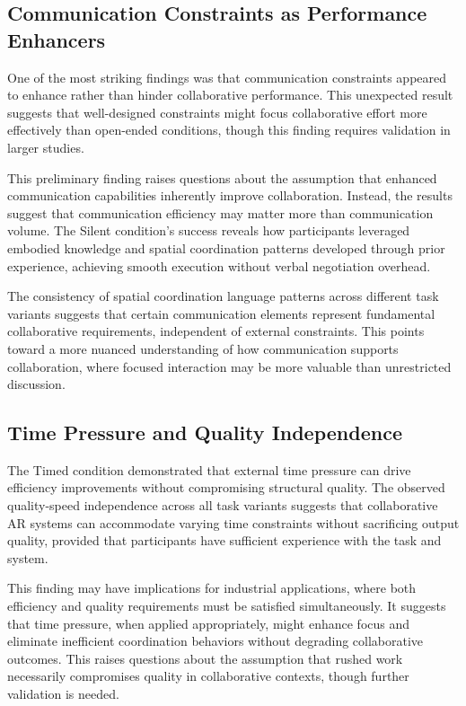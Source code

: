 \subsection{Communication Constraints as Performance Enhancers}
One of the most striking findings was that communication constraints appeared to enhance rather than hinder collaborative performance. This unexpected result suggests that well-designed constraints might focus collaborative effort more effectively than open-ended conditions, though this finding requires validation in larger studies.

This preliminary finding raises questions about the assumption that enhanced communication capabilities inherently improve collaboration. Instead, the results suggest that communication efficiency may matter more than communication volume. The Silent condition's success reveals how participants leveraged embodied knowledge and spatial coordination patterns developed through prior experience, achieving smooth execution without verbal negotiation overhead.

The consistency of spatial coordination language patterns across different task variants suggests that certain communication elements represent fundamental collaborative requirements, independent of external constraints. This points toward a more nuanced understanding of how communication supports collaboration, where focused interaction may be more valuable than unrestricted discussion.

\subsection{Time Pressure and Quality Independence}
The Timed condition demonstrated that external time pressure can drive efficiency improvements without compromising structural quality. The observed quality-speed independence across all task variants suggests that collaborative AR systems can accommodate varying time constraints without sacrificing output quality, provided that participants have sufficient experience with the task and system.

This finding may have implications for industrial applications, where both efficiency and quality requirements must be satisfied simultaneously. It suggests that time pressure, when applied appropriately, might enhance focus and eliminate inefficient coordination behaviors without degrading collaborative outcomes. This raises questions about the assumption that rushed work necessarily compromises quality in collaborative contexts, though further validation is needed.

